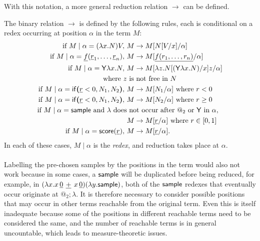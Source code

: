 With this notation, a more general reduction relation $\to$ can be defined. 
\begin{definition}
\label{def:more general red}
The binary relation $\to$ is defined by the following rules, each is conditional on a redex occurring at position $\alpha$ in the term $M$:
\begin{align*}
  \text{if } M \mid \alpha = (\lambda x.N) V,\ & M \to M[N[V/x]/\alpha] \\
  \text{if } M \mid \alpha = \underline f (\underline r_1, \dots , \underline r_n),\ & M \to M[\underline{f(r_1,\dots,r_n)}/\alpha] \\
  \text{if } M \mid \alpha = \mathsf{Y} \lambda x. N,\ & M \to M[\lambda z. N[(\mathsf{Y} \lambda x. N)/x] z/\alpha]\\ \text{where }z&\text{ is not free in $N$}\\
  \text{if } M \mid \alpha = \mathsf{if}\boldsymbol{(}\underline r < 0, N_1, N_2\boldsymbol{)},\ & M \to M[N_1/\alpha] \text{ where }r < 0 \\
  \text{if } M \mid \alpha = \mathsf{if}\boldsymbol{(}\underline r < 0, N_1, N_2\boldsymbol{)},\ & M \to M[N_2/\alpha] \text{ where }r \geq 0 \\
  \text{if } M \mid \alpha = \mathsf{sample} \text{ and $\lambda$ does}&\text{ not occur after $@_2$ or $\mathsf{Y}$ in $\alpha$},\\ & M \to M[\underline r/\alpha] \text{ where } r \in [0,1] \\
  \text{if } M \mid \alpha = \mathsf{score}(\underline r),\ & M \to M[\underline r/\alpha].
\end{align*}
In each of these cases, $M \mid \alpha$ is the \emph{redex}, and reduction takes place at $\alpha$.
\end{definition}

\paragraph{}
Labelling the pre-chosen samples by the positions in the term would also not work because in some cases, a $\mathsf{sample}$ will be duplicated before being reduced, for example, in $(\lambda x. x \, {\underline 0} \, \mathbin{\underline{+}} \, {x \, \underline 0}) (\lambda y. \mathsf{sample})$, both of the $\mathsf{sample}$ redexes that eventually occur originate at $@_2 ; \lambda$. 
It is therefore necessary to consider possible positions that may occur in other terms reachable from the original term. 
Even this is itself inadequate because some of the positions in different reachable terms need to be considered the same, and the number of reachable terms is in general uncountable, which leads to measure-theoretic issues.

